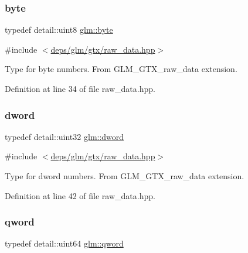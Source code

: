 \subsubsection{\texorpdfstring{byte}{byte}}
{\footnotesize\ttfamily typedef detail\+::uint8 \hyperlink{group__gtx__raw__data_gacd7fe1f2ad60a57f7d7ad4f1e6836efd}{glm\+::byte}}



{\ttfamily \#include $<$\hyperlink{raw__data_8hpp}{deps/glm/gtx/raw\+\_\+data.\+hpp}$>$}

Type for byte numbers. From G\+L\+M\+\_\+\+G\+T\+X\+\_\+raw\+\_\+data extension. 

Definition at line 34 of file raw\+\_\+data.\+hpp.

\mbox{\label{group__gtx__raw__data_ga1fc2589df6d44e923cd1820cf14805cf}} 
\subsubsection{\texorpdfstring{dword}{dword}}
{\footnotesize\ttfamily typedef detail\+::uint32 \hyperlink{group__gtx__raw__data_ga1fc2589df6d44e923cd1820cf14805cf}{glm\+::dword}}



{\ttfamily \#include $<$\hyperlink{raw__data_8hpp}{deps/glm/gtx/raw\+\_\+data.\+hpp}$>$}

Type for dword numbers. From G\+L\+M\+\_\+\+G\+T\+X\+\_\+raw\+\_\+data extension. 

Definition at line 42 of file raw\+\_\+data.\+hpp.

\mbox{\label{group__gtx__raw__data_ga32447af289e879589883c9b7e3be1246}} 
\subsubsection{\texorpdfstring{qword}{qword}}
{\footnotesize\ttfamily typedef detail\+::uint64 \hyperlink{group__gtx__raw__data_ga32447af289e879589883c9b7e3be1246}{glm\+::qword}}



